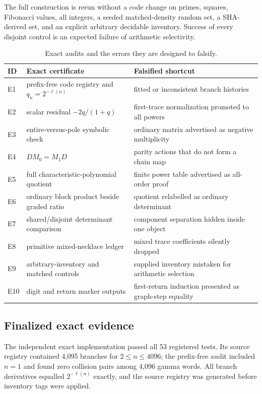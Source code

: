 The full construction is rerun without a code change on primes, squares,
Fibonacci values, all integers, a seeded matched-density random set, a
SHA-derived set, and an explicit arbitrary decidable inventory.  Success of
every disjoint control is an expected failure of arithmetic selectivity.

\begin{table}[t]
\centering
\caption{Exact audits and the errors they are designed to falsify.}
\label{tab:audits}
\small
\begin{tabularx}{\textwidth}{L{1.1cm}L{5.7cm}Y}
\toprule
ID & Exact certificate & Falsified shortcut \\
\midrule
E1 & prefix-free code registry and \(q_n=2^{-\ell(n)}\)
& fitted or inconsistent branch histories \\
E2 & scalar residual \(-2q/(1+q)\)
& first-trace normalization promoted to all powers \\
E3 & entire-versus-pole symbolic check
& ordinary matrix advertised as negative multiplicity \\
E4 & \(DM_0=M_1D\)
& parity actions that do not form a chain map \\
E5 & full characteristic-polynomial quotient
& finite power table advertised as all-order proof \\
E6 & ordinary block product beside graded ratio
& quotient relabelled as ordinary determinant \\
E7 & shared/disjoint determinant comparison
& component separation hidden inside one object \\
E8 & primitive mixed-necklace ledger
& mixed trace coefficients silently dropped \\
E9 & arbitrary-inventory and matched controls
& supplied inventory mistaken for arithmetic selection \\
E10 & digit and return marker outputs
& first-return induction presented as graph-step equality \\
\bottomrule
\end{tabularx}
\end{table}

\subsection{Finalized exact evidence}

The independent exact implementation passed all 53 registered tests.  Its
source registry contained 4,095 branches for \(2\le n\le4096\); the
prefix-free audit included \(n=1\) and found zero collision pairs among
4,096 gamma words.  All branch derivatives equalled
\(2^{-\ell(n)}\) exactly, and the source registry was generated before
inventory tags were applied.

